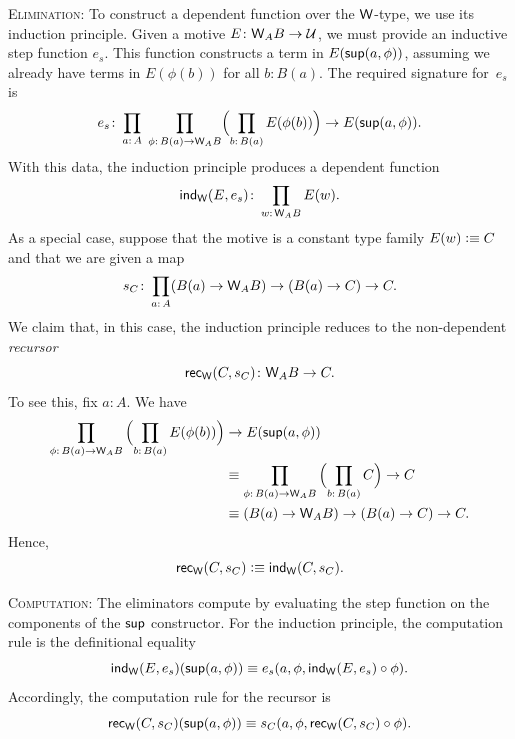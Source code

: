 \begin{defn}
    \textsc{Elimination:} To construct a dependent function over the $\mathsf{W}$-type, we use its induction principle. Given a motive $E\colon\fun W_AB\to\univ$, we must provide an inductive step function $e_s$. This function constructs a term in $E(\mathsf{sup}(a,\phi))$, assuming we already have terms in $E(\phi(b))$ for all $b\colon B(a)$. The required signature for~$e_s$ is
    \begin{equation}\label{eq:ind_W-step-function}
        e_s\colon
            \prod_{a\colon A}\;
            \prod_{\phi\colon B(a)\to\fun W_AB}
                \Bigl(\prod_{b\colon B(a)}E(\phi(b))\Bigr)
                \to E(\fun{sup}(a,\phi)).
    \end{equation}
    With this data, the induction principle produces a dependent function
    \begin{equation}\label{eq:W-induction-function}
        \fun{ind}_{\fun W}(E,e_s)
            \colon\prod_{w\colon\fun W_AB}E(w).
    \end{equation}
    As a special case, suppose that the motive is a constant type family $E(w)\mathrel{\vcentcolon}\equiv C$ and that we are given a map
    \begin{equation}\label{eq:W-type-step-function}
        s_C\colon\prod_{a\colon A}
            (B(a)\to\fun W_AB)\to(B(a)\to C)\to C.
    \end{equation}
    We claim that, in this case, the induction principle reduces to the non-dependent \textsl{recursor}
    \begin{equation}\label{eq:rec_W}
        \fun{rec}_{\fun W}(C, s_C)
            \colon \fun W_AB\to C.
    \end{equation}
    To see this, fix $a\colon A$. We have
    \begin{align*}
            \prod_{\phi\colon B(a)\to\fun W_AB}\,
            \Bigl(\prod_{b\colon B(a)}E(\phi(b))\Bigr)
            &\to E(\fun{sup}(a,\phi))\\
        &\equiv
            \prod_{\phi\colon B(a)\to \fun W_AB}\,
            \Bigl(\prod_{b\colon B(a)}C\Bigr)
            \to C\\
        &\equiv
            (B(a)\to\fun W_AB)\to(B(a)\to C)\to C.
    \end{align*}
    Hence,
    \[
        \mathsf{rec}_{\mathsf{W}}(C,s_C)
            \mathrel{\vcentcolon}\equiv\mathsf{ind}_{\mathsf{W}}(C,s_C).
    \]

    \textsc{Computation:} The eliminators compute by evaluating the step function on the components of the $\mathsf{sup}$ constructor. For the induction principle, the computation rule is the definitional equality
    \begin{equation}\label{eq:ind_W-computation-rule}
        \mathsf{ind}_{\mathsf{W}}(E,e_s)(\mathsf{sup}(a,\phi)) 
            \equiv
            e_s(a,\phi,\mathsf{ind}_{\mathsf{W}}(E,e_s)\circ\phi).
    \end{equation}
    Accordingly, the computation rule for the recursor is
    \begin{equation}\label{eq:rec_W-computation-rule}
        \mathsf{rec}_{\mathsf{W}}(C,s_C)(\mathsf{sup}(a,\phi))
            \equiv s_C(a,\phi,\mathsf{rec}_{\mathsf{W}}
                (C,s_C)\circ\phi).
    \end{equation}
\end{defn}

